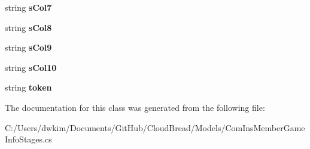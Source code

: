 \begin{DoxyCompactItemize}
\item 
string {\bfseries s\+Col7}\hypertarget{a00049_a51a56e9836c92ed7329280783900fe95}{}\label{a00049_a51a56e9836c92ed7329280783900fe95}

\item 
string {\bfseries s\+Col8}\hypertarget{a00049_a00012e1a664c0a04c9629ccf548caad5}{}\label{a00049_a00012e1a664c0a04c9629ccf548caad5}

\item 
string {\bfseries s\+Col9}\hypertarget{a00049_a9ef29f41a3036a93acfb9d227eb469fe}{}\label{a00049_a9ef29f41a3036a93acfb9d227eb469fe}

\item 
string {\bfseries s\+Col10}\hypertarget{a00049_a78f52f497a8223bf359cff384fc4186b}{}\label{a00049_a78f52f497a8223bf359cff384fc4186b}

\item 
string {\bfseries token}\hypertarget{a00049_a2347ce8055545d06fa045e61b0dd22e2}{}\label{a00049_a2347ce8055545d06fa045e61b0dd22e2}

\end{DoxyCompactItemize}


The documentation for this class was generated from the following file\+:\begin{DoxyCompactItemize}
\item 
C\+:/\+Users/dwkim/\+Documents/\+Git\+Hub/\+Cloud\+Bread/\+Models/Com\+Ins\+Member\+Game\+Info\+Stages.\+cs\end{DoxyCompactItemize}
